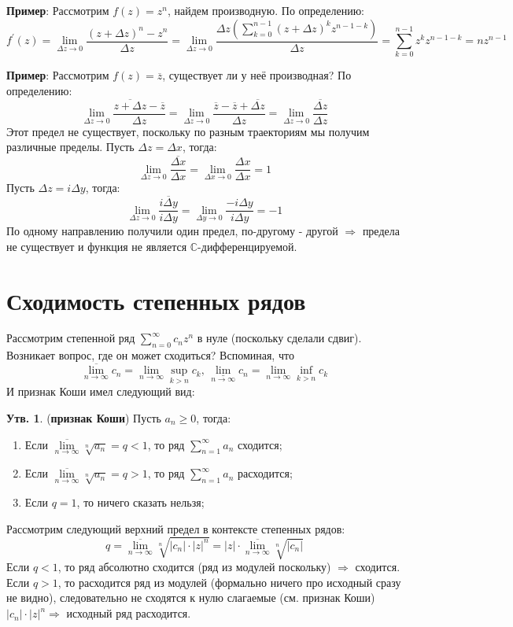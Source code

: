 \documentclass[12pt]{article}
\newcommand{\MC}{\mathbb{C}}
\theoremstyle{definition}
\newtheorem{prop}{Утв.}
\newcommand{\ddsum}[2]{\displaystyle\sum\limits_{#1}^{#2}}
\newcommand{\ssum}[1]{\displaystyle \sum\limits_{n=1}^{\infty}{#1}_n}
\begin{document}
\textbf{Пример}: Рассмотрим $f(z) = z^n$, найдем производную. По определению:
$$
	f^\prime(z) = \lim\limits_{\Delta z \to 0}\dfrac{(z + \Delta z)^n - z^n}{\Delta z} =  \lim\limits_{\Delta z \to 0}\dfrac{\Delta z \left(\ddsum{k = 0}{n-1} (z + \Delta z)^k z^{n-1 - k}\right)}{\Delta z} = \ddsum{k = 0}{n-1}z^k z^{n - 1- k} = nz^{n-1}
$$

\textbf{Пример}: Рассмотрим $f(z) = \overline{z}$, существует ли у неё производная? По определению:
$$
	\lim\limits_{\Delta z \to 0}\dfrac{\overline{z + \Delta z} - \overline{z}}{\Delta z} = \lim\limits_{\Delta z \to 0} \dfrac{\overline{z} - \overline{z} + \overline{\Delta z}}{\Delta z} = 
	\lim\limits_{\Delta z \to 0} \dfrac{ \overline{\Delta z}}{\Delta z}
$$
Этот предел не существует, поскольку по разным траекториям мы получим различные пределы. Пусть $\Delta z = \Delta x$, тогда:
$$
	\lim\limits_{\Delta z \to 0} \dfrac{ \overline{\Delta x}}{\Delta x} = \lim\limits_{\Delta x \to 0} \dfrac{ \Delta x}{\Delta x} = 1
$$
Пусть $\Delta z = i \Delta y$, тогда:
$$
	\lim\limits_{\Delta z \to 0} \dfrac{ \overline{i\Delta y}}{i\Delta y} = \lim\limits_{\Delta y \to 0} \dfrac{ -i\Delta y}{i\Delta y} = -1
$$
По одному направлению получили один предел, по-другому - другой $\Rightarrow$ предела не существует и функция не является $\MC$-дифференцируемой.

\newpage
\section*{Сходимость степенных рядов}
Рассмотрим степенной ряд $\ddsum{n = 0}{\infty}c_n z^n$ в нуле (поскольку сделали сдвиг). Возникает вопрос, где он может сходиться? Вспоминая, что 
$$
	\underset{n \to \infty}{\overline{\lim}}c_n = \lim\limits_{n \to \infty}\sup\limits_{k > n} c_k, \, \underset{n \to \infty}{\underline{\lim}}c_n = \lim\limits_{n \to \infty} \inf\limits_{k > n} c_k
$$
И признак Коши имел следующий вид:
\begin{prop}(\textbf{признак Коши})
	Пусть $a_n \geq 0$, тогда:
	\begin{enumerate}[label ={(\arabic*)}]
		\item Если $\underset{n \to \infty}{\overline{\lim}} \sqrt[n]{a_n} = q < 1$, то ряд $\ssum{a}$ сходится;
		\item Если $\underset{n \to \infty}{\overline{\lim}} \sqrt[n]{a_n} = q > 1$, то ряд $\ssum{a}$ расходится;
		\item Если $q = 1$, то ничего сказать нельзя;
	\end{enumerate}
\end{prop}
Рассмотрим следующий верхний предел в контексте степенных рядов:
$$
	q = \underset{n \to \infty}{\overline{\lim}}\sqrt[n]{|c_n|{\cdot}|z|^n} = |z|{\cdot}\underset{n \to \infty}{\overline{\lim}}\sqrt[n]{|c_n|}
$$ 
Если $q < 1$, то ряд абсолютно сходится (ряд из модулей поскольку) $\Rightarrow$ сходится. Если $q > 1$, то расходится ряд из модулей (формально ничего про исходный сразу не видно), следовательно не сходятся к нулю слагаемые (см. признак Коши) $|c_n|{\cdot}|z|^n \Rightarrow$ исходный ряд расходится. 
\end{document}
